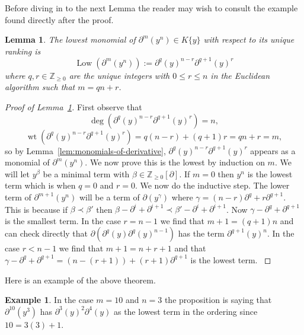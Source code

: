 \documentclass[12pt]{book}
\numberwithin{equation}{section}
\newtheorem{lemma}[theorem]{Lemma}
\theoremstyle{definition}
\newtheorem{example}[theorem]{Example}
\theoremstyle{remark}
\newcommand{\ZZ}{\mathbb{Z}}
\newcommand{\Low}{\operatorname{Low}}
\newcommand{\wt}{\operatorname{wt}}
\begin{document}
Before diving in to the next Lemma the reader may wish to consult the example found directly after the proof.
\begin{lemma}\label{lem:lowest-monomial}
	The lowest monomial of $\partial^m(y^n) \in K\lbrace y \rbrace$ with respect to its unique ranking is 
	$$\Low(\partial^m(y^n)):= \partial^q(y)^{n-r}\partial^{q+1}(y)^r$$
	where $q, r \in \ZZ_{\geq 0}$ are the unique integers with $0 \leq r \leq n$ in the Euclidean algorithm such that
	$m= qn+r$.
\end{lemma}
\begin{proof}[Proof of Lemma~\ref{lem:lowest-monomial}]
	First observe that 
	$$ \deg( \partial^q(y)^{n-r}\partial^{q+1}(y)^r)= n,$$
	$$ \wt( \partial^q(y)^{n-r}\partial^{q+1}(y)^r) = q(n-r) + (q+1)r  =qn+r =m,$$
	so by Lemma~\ref{lem:monomials-of-derivative}, $\partial^q(y)^{n-r}\partial^{q+1}(y)^r$ appears as a monomial of $\partial^m(y^n)$.
	We now prove this is the lowest by induction on $m$. 
	We will let $y^{\beta}$ be a minimal term with $\beta\in \ZZ_{\geq 0}[\partial]$.
	If $m=0$ then $y^n$ is the lowest term which is when $q=0$ and $r=0$.
	We now do the inductive step. 
	The lower term of $\partial^{m+1}(y^n)$ will be a term of $\partial(y^{\gamma})$ where $\gamma= (n-r)\partial^q + r \partial^{q+1}$. 
	This is because if $\beta \prec \beta'$ then $\beta -\partial^i + \partial^{i+1} \prec \beta' -\partial^i + \partial^{i+1}$. 
	Now $\gamma - \partial^q + \partial^{q+1}$ is the smallest term.
	In the case $r=n-1$ we find that $m+1 = (q+1)n$ and can check directly that $\partial( \partial^q(y) \partial^q(y)^{n-1})$ has the term $\partial^{q+1}(y)^n$. 
	In the case $r<n-1$ we find that $m+1 = n+r+1$ and that $\gamma -\partial^q + \partial^{q+1} = (n-(r+1))+(r+1)\partial^{q+1}$ is the lowest term.
	\cite[\S21]{Ritt1943}
\end{proof}
Here is an example of the above theorem.
\begin{example}
	In the case $m=10$ and $n=3$ the proposition is saying that $\partial^{10}(y^3)$ has $\partial^3(y)^2\partial^4(y)$ as the lowest term in the ordering since $10=3(3)+1$.
\end{example}
\end{document}
